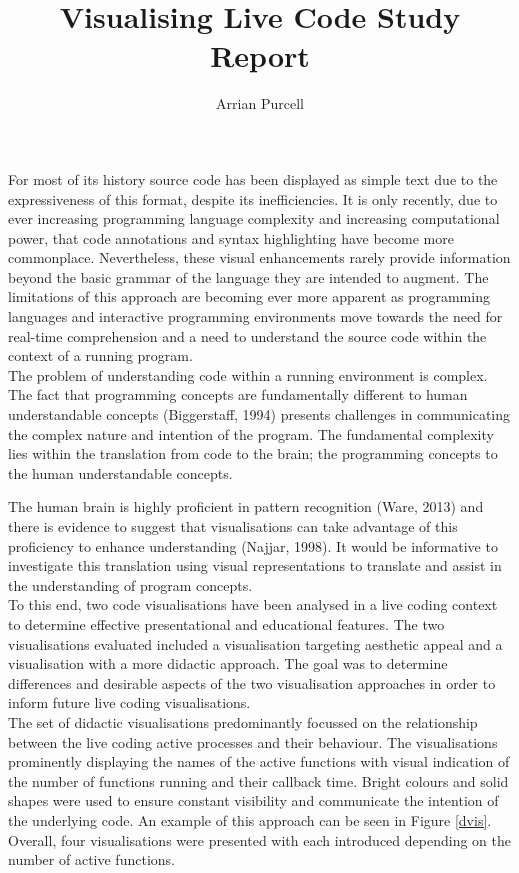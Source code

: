 \documentclass{article}
\begin{document}
\title{Visualising Live Code Study Report}
\author{Arrian Purcell}

\maketitle



For most of its history source code has been displayed as simple text due to the expressiveness of this format, despite its inefficiencies. It is only recently, due to ever increasing programming language complexity and increasing computational power, that code annotations and syntax highlighting have become more commonplace. Nevertheless, these visual enhancements rarely provide information beyond the basic grammar of the language they are intended to augment. The limitations of this approach are becoming ever more apparent as programming languages and interactive programming environments move towards the need for real-time comprehension and a need to understand the source code within the context of a running program.\\

The problem of understanding code within a running environment is complex. The fact that programming concepts are fundamentally different to human understandable concepts (Biggerstaff, 1994) presents challenges in communicating the complex nature and intention of the program. The fundamental complexity lies within the translation from code to the brain; the programming concepts to the human understandable concepts. 

The human brain is highly proficient in pattern recognition (Ware, 2013) and there is evidence to suggest that visualisations can take advantage of this proficiency to enhance understanding (Najjar, 1998). It would be informative to investigate this translation using visual representations to translate and assist in the understanding of program concepts.\\

To this end, two code visualisations have been analysed in a live coding context to determine effective presentational and educational features. The two visualisations evaluated included a visualisation targeting aesthetic appeal and a visualisation with a more didactic approach. The goal was to determine differences and desirable aspects of the two visualisation approaches in order to inform future live coding visualisations.\\

The set of didactic visualisations predominantly focussed on the relationship between the live coding active processes and their behaviour. The visualisations prominently displaying the names of the active functions with visual indication of the number of functions running and their callback time. Bright colours and solid shapes were used to ensure constant visibility and communicate the intention of the underlying code. An example of this approach can be seen in Figure \ref{dvis}. Overall, four visualisations were presented with each introduced depending on the number of active functions.\\
\end{document}
